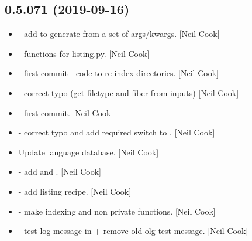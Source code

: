 \documentclass[a4paper,10pt,english]{report}
\begin{document}
\subsection{0.5.071 (2019-09-16)}
\label{\detokenize{misc/changelog:id72}}\begin{itemize}
\item {} 
 - add  to
generate  from a set of args/kwargs. {[}Neil Cook{]}

\item {} 
 - functions for listing.py. {[}Neil
Cook{]}

\item {} 
 - first commit - code to re-index directories.
{[}Neil Cook{]}

\item {} 
 - correct typo (get filetype
and fiber from inputs) {[}Neil Cook{]}

\item {} 
 - first commit. {[}Neil Cook{]}

\item {} 
 - correct typo and add required switch to
. {[}Neil Cook{]}

\item {} 
Update language database. {[}Neil Cook{]}

\item {} 
 - add  and
. {[}Neil Cook{]}

\item {} 
 - add listing recipe.
{[}Neil Cook{]}

\item {} 
 - make indexing and  non
private functions. {[}Neil Cook{]}

\item {} 
 - test log message in  + remove
old olg test message. {[}Neil Cook{]}


\end{itemize}
\end{document}
